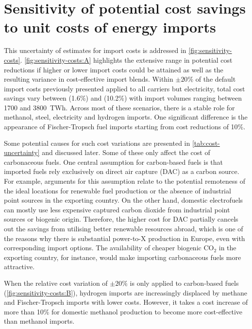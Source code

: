 \section*{Sensitivity of potential cost savings to unit costs of energy imports}

This uncertainty of estimates for import costs is addressed in
\cref{fig:sensitivity-costs}. \cref{fig:sensitivity-costs:A} highlights the
extensive range in potential cost reductions if higher or lower import costs
could be attained as well as the resulting variance in cost-effective import
blends. Within $\pm 20\%$ of the default import costs previously presented
applied to all carriers but electricity, total cost savings vary between
 (1.6\%) and  (10.2\%) with import volumes ranging between
1700 and 3800~TWh. Across most of these scenarios, there is a stable role for
methanol, steel, electricity and hydrogen imports. One significant difference is
the appearance of Fischer-Tropsch fuel imports starting from cost reductions of
10\%.

Some potential causes for such cost variations are presented in
\cref{tab:cost-uncertainty} and discussed later. Some of these only affect the
cost of carbonaceous fuels. One central assumption for carbon-based fuels is
that imported fuels rely exclusively on direct air capture (DAC) as a carbon
source. For example, arguments for this assumption relate to the potential
remoteness of the ideal locations for renewable fuel production or the absence
of industrial point sources in the exporting country.
On the other hand,
domestic electrofuels can mostly use less expensive captured carbon dioxide from
industrial point sources or biogenic origin. Therefore, the higher cost for DAC
partially cancels out the savings from utilising better renewable resources
abroad, which is one of the reasons why there is substantial power-to-X
production in Europe, even with corresponding import options. The availability
of cheaper biogenic CO$_2$ in the exporting country, for instance, would
make importing carbonaceous fuels more attractive.

When the relative cost variation of $\pm 20\%$ is only applied to carbon-based
fuels (\cref{fig:sensitivity-costs:B}), hydrogen imports are increasingly
displaced by methane and Fischer-Tropsch imports with lower costs. However, it
takes a cost increase of more than 10\% for domestic methanol production to
become more cost-effective than methanol imports. 

